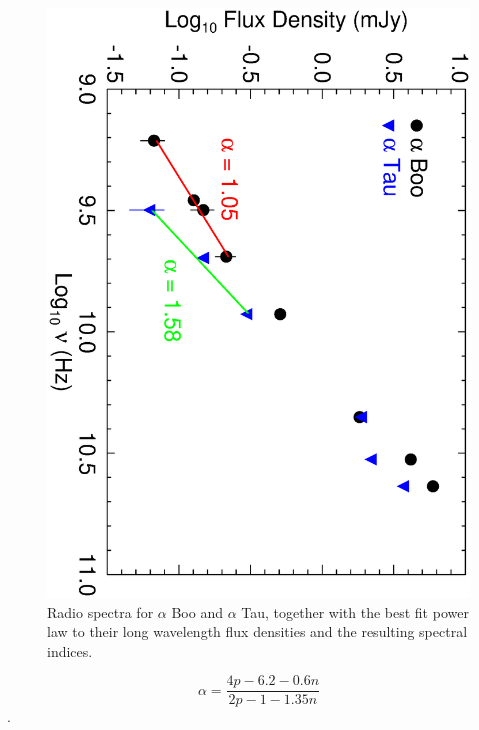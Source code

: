 \documentclass[iop]{emulateapj}
\begin{document}
\begin{figure}
\includegraphics[trim = 0mm 0mm 0mm 10mm, clip,scale=0.385,angle=90]{fig3.ps}
\caption{Radio spectra for $\alpha$ Boo and $\alpha$ Tau, together with the best fit power law to their long wavelength flux densities and the resulting spectral indices.}
\label{fig:fig3}
\end{figure}

\begin{equation}
\alpha = \frac{4p -6.2 -0.6n}{2p-1-1.35n}
\label{eq:eq1}
\end{equation}
\citep[e.g.,][]{1987ApJ...312..813S}. 
\end{document}
